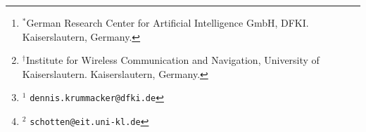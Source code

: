 %
\author{%
Dennis Krummacker$^{1,*}$
and
Hans D. Schotten$^{2,*,\dag}$%
%
\thanks{%
$^{*}$German Research Center for Artificial Intelligence GmbH, DFKI.
Kaiserslautern, Germany.%
}%
%
\thanks{%
$^{\dag}$Institute for Wireless Communication and Navigation, University of Kaiserslautern.
Kaiserslautern, Germany.%
}%
%
\thanks{%
$^{1}$%
{\tt\small dennis.krummacker@dfki.de}%
}%
%
\thanks{%
$^{2}$%
{\tt\small schotten@eit.uni-kl.de}%
}%
}%
%